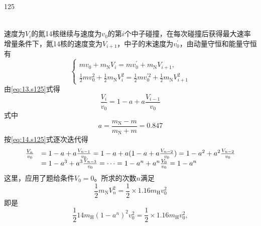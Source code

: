 \begin{solution}{125}
\begin{subsolution}
\begin{align}
        \end{align}
    \end{subsolution}
    \begin{subsolution}
        速度为$V _ { i }$的氮14核继续与速度为$v _ { 0 }$的第$i$个中子碰撞，在每次碰撞后获得最大速率增量条件下，氮14核的速度变为$V _ { i + 1 }$，中子的末速度为$v _ { 0 } ^ { \prime }$，由动量守恒和能量守恒有
        \begin{equation}
            \left\{ \begin{array}{l} m v _ {0} + m _ {\mathrm{N}} V _ {i} = m v _ {0} ^ {\prime} + m _ {\mathrm{N}} V _ {i + 1}, \\ \frac {1}{2} m v _ {0} ^ {2} + \frac {1}{2} m _ {\mathrm{N}} V _ {i} ^ {2} = \frac {1}{2} m v _ {0} ^ {\prime 2} + \frac {1}{2} m _ {\mathrm{N}} V _ {i + 1} ^ {2} \end{array} \right.
            \label{eq:13.s125}
        \end{equation}
        由\eqref{eq:13.s125}式得
        \begin{equation}
            \frac {V _ {i}}{v _ {0}} = 1 - a + a \frac {V _ {i - 1}}{v _ {0}}
            \label{eq:14.s125}
        \end{equation}
        式中
        \begin{equation}
            a = \frac {m _ {\mathrm{N}} - m}{m _ {\mathrm{N}} + m} = 0.847
            \label{eq:15.s125}
        \end{equation}
        按\eqref{eq:14.s125}式逐次迭代得
        \begin{equation}
            \begin{array}{r l} \frac {V _ {n}}{v _ {0}} & = 1 - a + a \frac {V _ {n - 1}}{v _ {0}} = 1 - a + a (1 - a + a \frac {V _ {n - 2}}{v _ {0}}) = 1 - a ^ {2} + a ^ {2} \frac {V _ {n - 2}}{v _ {0}} \\ & = 1 - a ^ {3} + a ^ {3} \frac {V _ {n - 3}}{v _ {0}} = \dots = 1 - a ^ {n} + a ^ {n} \frac {V _ {0}}{v _ {0}} = 1 - a ^ {n} \end{array}
            \label{eq:16.s125}
        \end{equation}
        这里，应用了题给条件$V _ {0} = 0$。所求的次数$n$满足
        \begin{equation}
            \frac {1}{2} m _ {\mathrm{N}} V _ {n} ^ {2} = \frac {1}{2} \times 1.16 m _ {\mathrm{H}} v _ {0} ^ {2}
            \label{eq:17.s125}
        \end{equation}
        即是
        \begin{equation}
            \frac {1}{2} 14 m _ {\mathrm{H}} (1 - a ^ {n}) ^ {2} v _ {0} ^ {2} = \frac {1}{2} \times 1.16 m _ {\mathrm{H}} v _ {0} ^ {2},

\end{equation}
\end{subsolution}
\end{solution}
